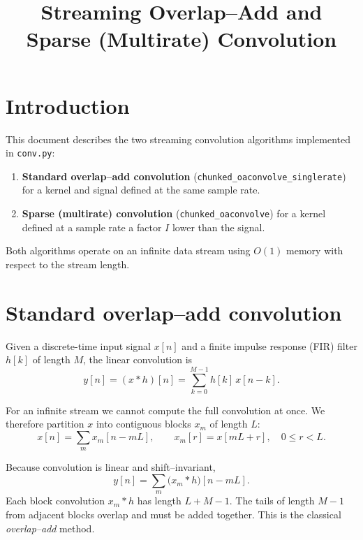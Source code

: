 \documentclass[a4paper,11pt]{article}
\title{Streaming Overlap--Add and Sparse (Multirate) Convolution}
\author{}
\date{}
\begin{document}
\maketitle

\section{Introduction}

This document describes the two streaming convolution algorithms implemented in \texttt{conv.py}:
\begin{enumerate}
    \item \textbf{Standard overlap--add convolution} (\texttt{chunked\_oaconvolve\_singlerate}) for a kernel and signal defined at the same sample rate.
    \item \textbf{Sparse (multirate) convolution} (\texttt{chunked\_oaconvolve}) for a kernel defined at a sample rate a factor $I$ lower than the signal.
\end{enumerate}
Both algorithms operate on an infinite data stream using $O(1)$ memory with respect to the stream length.

\section{Standard overlap--add convolution}

Given a discrete-time input signal $x[n]$ and a finite impulse response (FIR) filter $h[k]$ of length $M$, the linear convolution is
\begin{equation}
    y[n] = (x * h)[n] = \sum_{k=0}^{M-1} h[k]\, x[n-k] .
    \label{eq:convolution}
\end{equation}

For an infinite stream we cannot compute the full convolution at once.  We therefore partition $x$ into contiguous blocks $x_m$ of length $L$:
\begin{equation}
    x[n] = \sum_{m} x_m[n - mL], \qquad
    x_m[r] = x[mL + r], \quad 0 \le r < L .
\end{equation}

Because convolution is linear and shift--invariant,
\begin{equation}
    y[n] = \sum_{m} \bigl(x_m * h\bigr)[n - mL] .
\end{equation}
Each block convolution $x_m * h$ has length $L+M-1$.  The tails of length $M-1$ from adjacent blocks overlap and must be added together.  This is the classical \emph{overlap--add} method.
\end{document}
